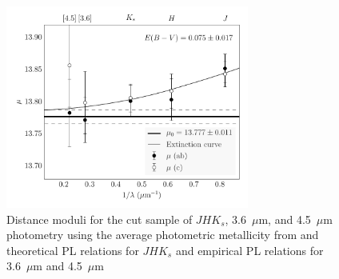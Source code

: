 \documentclass[a4paper,fleqn,usenatbib]{mnras}
\begin{document}

\begin{figure}
\begin{center}
\includegraphics[width=80mm]{final_plots/multiwavelength_distance_abc.pdf}
\caption{Distance moduli for the cut sample of $J\!H\!K_s$, 3.6~$\mu$m, and 4.5~$\mu$m photometry using the average photometric metallicity from \citet{2006ApJ...640L..43S} and theoretical PL relations for $J\!H\!K_s$ and empirical PL relations for 3.6~$\mu$m and 4.5~$\mu$m}
\label{fig:omegaCen_dist_m4}
\end{center}
\end{figure}
\end{document}
